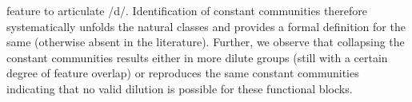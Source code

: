 feature to articulate /d/. Identification of constant communities therefore systematically unfolds the natural classes
and provides a formal definition for the same (otherwise absent in the literature). 
Further, we observe that
collapsing the constant communities results either in more dilute groups (still with a certain degree of feature overlap) or reproduces the
same constant communities indicating that no valid dilution is possible for these functional blocks. 


\begin{table}
\centering
\caption{Few constant communities of PhoNet and the features they have in common.}\label{phon}
\end{table}




